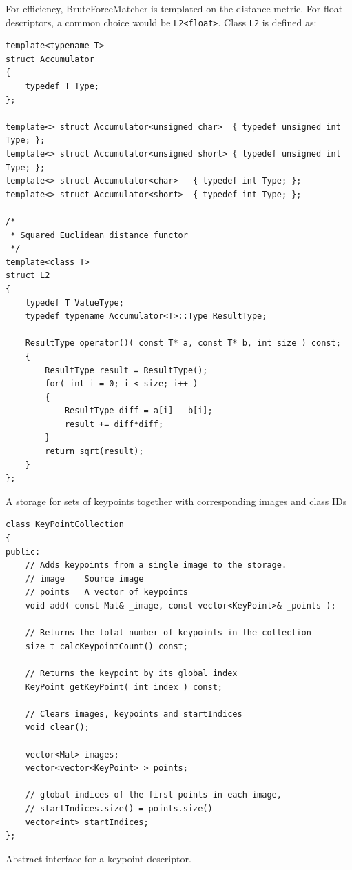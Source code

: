 For efficiency, BruteForceMatcher is templated on the distance metric.
For float descriptors, a common choice would be \texttt{L2<float>}. Class \texttt{L2} is defined as:
\begin{lstlisting}
template<typename T>
struct Accumulator
{
    typedef T Type;
};

template<> struct Accumulator<unsigned char>  { typedef unsigned int Type; };
template<> struct Accumulator<unsigned short> { typedef unsigned int Type; };
template<> struct Accumulator<char>   { typedef int Type; };
template<> struct Accumulator<short>  { typedef int Type; };

/*
 * Squared Euclidean distance functor
 */
template<class T>
struct L2
{
    typedef T ValueType;
    typedef typename Accumulator<T>::Type ResultType;

    ResultType operator()( const T* a, const T* b, int size ) const;
    {
        ResultType result = ResultType();
        for( int i = 0; i < size; i++ )
        {
            ResultType diff = a[i] - b[i];
            result += diff*diff;
        }
        return sqrt(result);
    }
};
\end{lstlisting}

A storage for sets of keypoints together with corresponding images and class IDs

\begin{lstlisting}
class KeyPointCollection
{
public:
    // Adds keypoints from a single image to the storage.
    // image    Source image
    // points   A vector of keypoints
    void add( const Mat& _image, const vector<KeyPoint>& _points );

    // Returns the total number of keypoints in the collection
    size_t calcKeypointCount() const;

    // Returns the keypoint by its global index
    KeyPoint getKeyPoint( int index ) const;

    // Clears images, keypoints and startIndices
    void clear();

    vector<Mat> images;
    vector<vector<KeyPoint> > points;

    // global indices of the first points in each image,
    // startIndices.size() = points.size()
    vector<int> startIndices;
};
\end{lstlisting}

Abstract interface for a keypoint descriptor.

